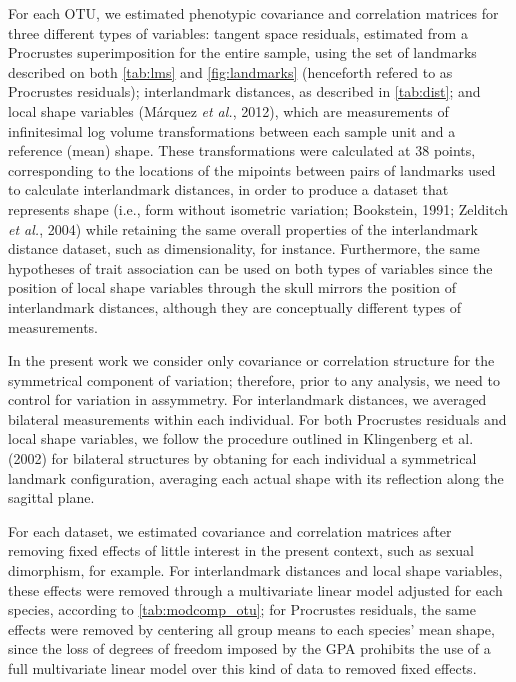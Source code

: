 \documentclass[12pt,]{article}
\begin{document}


For each OTU, we estimated phenotypic covariance and correlation
matrices for three different types of variables: tangent space
residuals, estimated from a Procrustes superimposition for the entire
sample, using the set of landmarks described on both \autoref{tab:lms}
and \autoref{fig:landmarks} (henceforth refered to as Procrustes
residuals); interlandmark distances, as described in \autoref{tab:dist};
and local shape variables (Márquez \emph{et al.}, 2012), which are
measurements of infinitesimal log volume transformations between each
sample unit and a reference (mean) shape. These transformations were
calculated at 38 points, corresponding to the locations of the mipoints
between pairs of landmarks used to calculate interlandmark distances, in
order to produce a dataset that represents shape (i.e., form without
isometric variation; Bookstein, 1991; Zelditch \emph{et al.}, 2004)
while retaining the same overall properties of the interlandmark
distance dataset, such as dimensionality, for instance. Furthermore, the
same hypotheses of trait association can be used on both types of
variables since the position of local shape variables through the skull
mirrors the position of interlandmark distances, although they are
conceptually different types of measurements.

In the present work we consider only covariance or correlation structure
for the symmetrical component of variation; therefore, prior to any
analysis, we need to control for variation in assymmetry. For
interlandmark distances, we averaged bilateral measurements within each
individual. For both Procrustes residuals and local shape variables, we
follow the procedure outlined in Klingenberg et al. (2002) for bilateral
structures by obtaning for each individual a symmetrical landmark
configuration, averaging each actual shape with its reflection along the
sagittal plane.

For each dataset, we estimated covariance and correlation matrices after
removing fixed effects of little interest in the present context, such
as sexual dimorphism, for example. For interlandmark distances and local
shape variables, these effects were removed through a multivariate
linear model adjusted for each species, according to
\autoref{tab:modcomp_otu}; for Procrustes residuals, the same effects
were removed by centering all group means to each species' mean shape,
since the loss of degrees of freedom imposed by the GPA prohibits the
use of a full multivariate linear model over this kind of data to
removed fixed effects.
\end{document}
